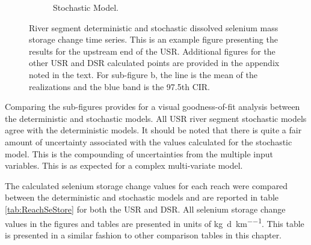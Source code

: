 \begin{linenumbers}
\begin{figure}[htbp]
\begin{subfigure}{0.5\textwidth}
		\caption{Stochastic Model.}
		\label{sub:ExampleSSeMassChange}
	\end{subfigure}
	\caption[River segment deterministic and stochastic dissolved selenium mass storage change time series.]{River segment deterministic and stochastic dissolved selenium mass storage change time series.  This is an example figure presenting the results for the upstream end of the USR.  Additional figures for the other USR and DSR calculated points are provided in the appendix noted in the text.  For sub-figure b, the line is the mean of the realizations and the blue band is the 97.5th CIR.}
	\label{fig:ExampleSeMassChange}
\end{figure}

Comparing the sub-figures provides for a visual goodness-of-fit analysis between the deterministic and stochastic models.  All USR river segment stochastic models agree with the deterministic models.  It should be noted that there is quite a fair amount of uncertainty associated with the values calculated for the stochastic model.  This is the compounding of uncertainties from the multiple input variables.  This is as expected for a complex multi-variate model.

The calculated selenium storage change values for each reach were compared between the deterministic and stochastic models and are reported in table \ref{tab:ReachSeStore} for both the USR and DSR.  All selenium storage change values in the figures and tables are presented in units of \si{\kilo\gram\per\day\per\kilo\meter}.  This table is presented in a similar fashion to other comparison tables in this chapter.


\end{linenumbers}
